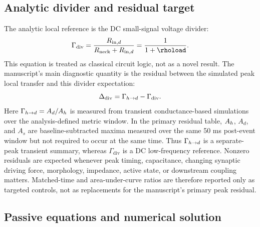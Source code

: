 \subsection{Analytic divider and residual target}

The analytic local reference is the DC small-signal voltage divider:
\begin{equation}
\Gamma_{\mathrm{div}}=
\frac{\Rin}{\Rneck+\Rin}
=\frac{1}{1+\rhoload}.
\label{eq:divider}
\end{equation}
This equation is treated as classical circuit logic, not as a novel result. The manuscript's main diagnostic quantity is the residual between the simulated peak local transfer and this divider expectation:
\begin{equation}
\Delta_{\mathrm{div}}=\Gamma_{h\rightarrow d}-\Gamma_{\mathrm{div}}.
\label{eq:divider_residual}
\end{equation}
Here $\Gamma_{h\rightarrow d}=A_d/A_h$ is measured from transient conductance-based simulations over the analysis-defined metric window. In the primary residual table, $A_h$, $A_d$, and $A_s$ are baseline-subtracted maxima measured over the same 50 ms post-event window but not required to occur at the same time. Thus $\Gamma_{h\rightarrow d}$ is a separate-peak transient summary, whereas $\Gamma_{\mathrm{div}}$ is a DC low-frequency reference. Nonzero residuals are expected whenever peak timing, capacitance, changing synaptic driving force, morphology, impedance, active state, or downstream coupling matters. Matched-time and area-under-curve ratios are therefore reported only as targeted controls, not as replacements for the manuscript's primary peak residual.

\subsection{Passive equations and numerical solution}

